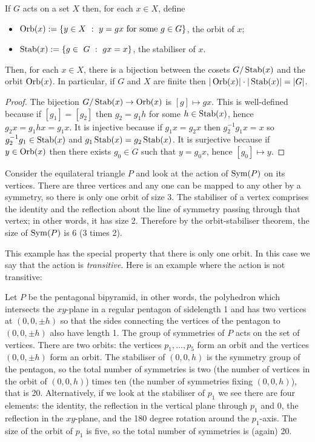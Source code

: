 \documentclass[12pt]{article}
\begin{document}
\begin{thm}
  If $G$ acts on a set $X$ then, for each $x\in X$, define
  \begin{itemize}
  \item $\operatorname{Orb}(x):=\{y\in X\ :\ y=gx\mbox{ for some }g\in G\}$, the orbit of $x$;
  \item $\OP{Stab}(x):=\{g\in\ G\ :\ gx=x\}$, the stabiliser of $x$.
  \end{itemize}
  Then, for each $x\in X$, there is a bijection between the cosets $G/\operatorname{Stab}(x)$ and the orbit $\operatorname{Orb}(x)$. In particular, if $G$ and $X$ are finite then $|\operatorname{Orb}(x)|\cdot|\operatorname{Stab}(x)|=|G|$.  
\end{thm}
\begin{proof}
The bijection $G/\operatorname{Stab}(x)\to\operatorname{Orb}(x)$ is $[g]\mapsto gx$. This is well-defined because if $[g_1]=[g_2]$ then $g_2=g_1h$ for some $h\in\operatorname{Stab}(x)$, hence $g_2x=g_1hx=g_1x$. It is injective because if $g_1x=g_2x$ then $g_2^{-1}g_1x=x$ so $g_2^{-1}g_1\in\operatorname{Stab}(x)$ and $g_1\operatorname{Stab}(x)=g_2\operatorname{Stab}(x)$. It is surjective because if $y\in\operatorname{Orb}(x)$ then there exists $g_0\in G$ such that $y=g_0x$, hence $[g_0]\mapsto y$.
\end{proof}

\begin{exm}
Consider the equilateral triangle $P$ and look at the action of $\operatorname{Sym}(P)$ on its vertices. There are three vertices and any one can be mapped to any other by a symmetry, so there is only one orbit of size 3. The stabiliser of a vertex comprises the identity and the reflection about the line of symmetry passing through that vertex; in other words, it has size 2. Therefore by the orbit-stabiliser theorem, the size of $\operatorname{Sym}(P)$ is 6 (3 times 2).
\end{exm}

This example has the special property that there is only one orbit. In this case we say that the action is {\em transitive}. Here is an example where the action is not transitive:

\begin{exm}
Let $P$ be the pentagonal bipyramid, in other words, the polyhedron which intersects the $xy$-plane in a regular pentagon of sidelength 1 and has two vertices at $(0,0,\pm h)$ so that the sides connecting the vertices of the pentagon to $(0,0,\pm h)$ also have length 1. The group of symmetries of $P$ acts on the set of vertices. There are two orbits: the vertices $p_1,\ldots,p_5$ form an orbit and the vertices $(0,0,\pm h)$ form an orbit. The stabiliser of $(0,0,h)$ is the symmetry group of the pentagon, so the total number of symmetries is two (the number of vertices in the orbit of $(0,0,h)$) times ten (the number of symmetries fixing $(0,0,h)$), that is 20. Alternatively, if we look at the stabiliser of $p_1$ we see there are four elements: the identity, the reflection in the vertical plane through $p_1$ and 0, the reflection in the $xy$-plane, and the 180 degree rotation around the $p_1$-axis. The size of the orbit of $p_1$ is five, so the total number of symmetries is (again) 20.
\end{exm}
\end{document}
